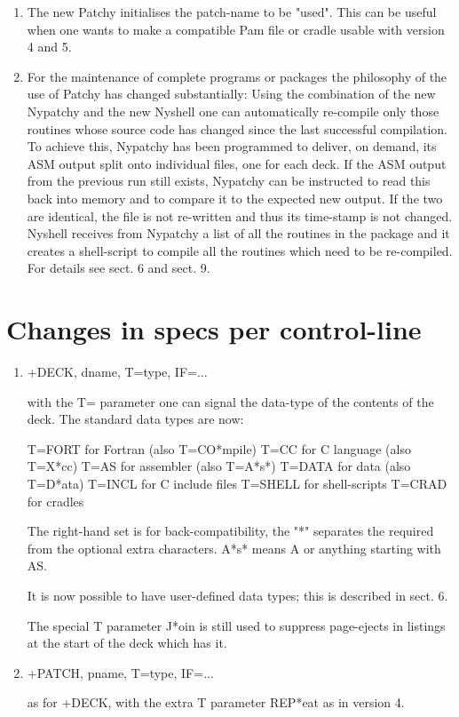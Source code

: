 \begin{enumerate}
\item
The new Patchy initialises the patch-name  to be "used".
This can be useful when one wants to make a compatible Pam file or
cradle usable with version 4 and 5.

\item
For the maintenance of complete programs or packages the philosophy of the
use of Patchy has changed substantially: Using the combination of the new
Nypatchy and the new Nyshell one can automatically re-compile only those
routines whose source code has changed since the last successful compilation.
To achieve this, Nypatchy has been programmed to deliver, on demand, its
ASM output split onto individual files, one for each deck. If the ASM output
from the previous run still exists, Nypatchy can be instructed to read this
back into memory and to compare it to the expected new output. If the two
are identical, the file is not re-written and thus its time-stamp is not
changed. Nyshell receives from Nypatchy a list of all the routines in the
package and it creates a shell-script to compile all the routines which
need to be re-compiled. For details see sect. 6 and sect. 9.
\end{enumerate}


\section{Changes in specs per control-line}
\label{sec:2}

\renewcommand{\labelenumi}{\ref{sec:2}.\theenumi)\ }

\begin{enumerate}
\item
+DECK, dname, T=type, IF=...

with the T= parameter one can signal the data-type of the contents of
the deck. The standard data types are now:

      T=FORT   for Fortran         (also T=CO*mpile)
      T=CC     for C language      (also T=X*cc)
      T=AS     for assembler       (also T=A*s*)
      T=DATA   for data            (also T=D*ata)
      T=INCL   for C include files
      T=SHELL  for shell-scripts
      T=CRAD   for cradles

The right-hand set is for back-compatibility, the "*" separates the
required from the optional extra characters. A*s* means A or anything
starting with AS.

It is now possible to have user-defined data types; this is described
in sect. 6.

The special T parameter J*oin is still used to suppress page-ejects
in listings at the start of the deck which has it.


\item
+PATCH, pname, T=type, IF=...

as for +DECK, with the extra T parameter REP*eat as in version 4.


\end{enumerate}


